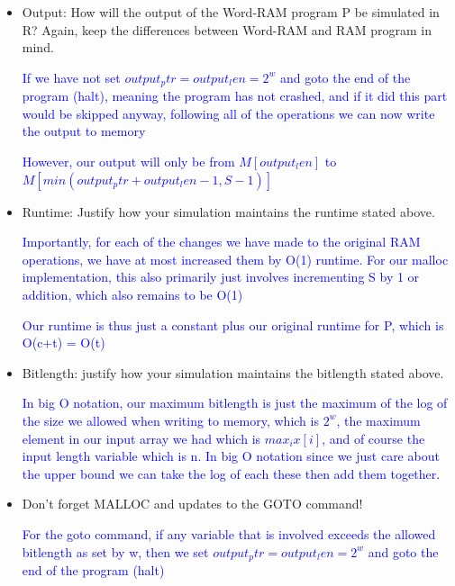 \documentclass[11pt]{report}
\begin{document}
\begin{enumerate}
\begin{itemize}
\textcolor{blue}{For writing to memory, if we want to write to an index i, we check $i-S=0$ using goto and if so then set $output_ptr = output_len = 2^w$ and goto the end of the program (halt).}

\textcolor{blue}{For reading to memory, if we want to read an index i, we check $i-S=0$ using goto and if so then set $output_ptr = output_len = 2^w$ and goto the end of the program (halt).}

\item Output: How will the output of the Word-RAM program P be simulated in R? Again, keep the differences between Word-RAM and RAM program in mind.

\textcolor{blue}{If we have not set $output_ptr = output_len = 2^w$ and goto the end of the program (halt), meaning the program has not crashed, and if it did this part would be skipped anyway, following all of the operations we can now write the output to memory}

\textcolor{blue}{However, our output will only be from $M[output_len]$ to $M[min(output_ptr+output_len-1,S-1)]$}

\item Runtime: Justify how your simulation maintains the runtime stated above.

\textcolor{blue}{Importantly, for each of the changes we have made to the original RAM operations, we have at most increased them by O(1) runtime. For our malloc implementation, this also primarily just involves incrementing S by 1 or addition, which also remains to be O(1)}

\textcolor{blue}{Our runtime is thus just a constant plus our original runtime for P, which is O(c+t) = O(t)}

\item Bitlength: justify how your simulation maintains the bitlength stated above.

\textcolor{blue}{In big O notation, our maximum bitlength is just the maximum of the log of the size we allowed when writing to memory, which is $2^w$, the maximum element in our input array we had which is $max_ix[i]$, and of course the input length variable which is n. In big O notation since we just care about the upper bound we can take the log of each these then add them together.}

\item Don't forget MALLOC and updates to the GOTO command!

\textcolor{blue}{For the goto command, if any variable that is involved exceeds the allowed bitlength as set by w, then we set $output_ptr = output_len = 2^w$ and goto the end of the program (halt)}


\end{itemize}
\end{enumerate}
\end{document}
